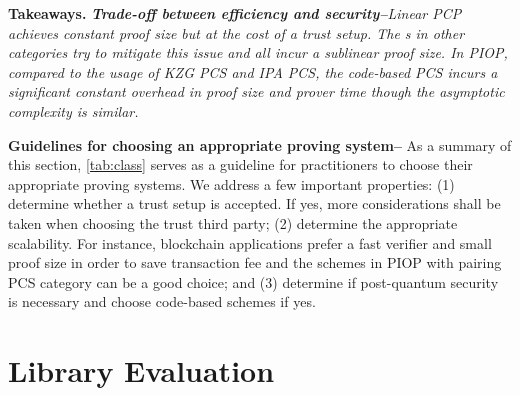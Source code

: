 \documentclass[letterpaper,twocolumn,10pt]{article}
\theoremstyle{definition}
\newcommand{\zk}{\text{zk-SNARK}\xspace}
\newcommand{\new}[1]{{#1}\xspace}
\newenvironment{takeaway}[1][]
  {
 \begin{tcolorbox}
 [%
    enhanced, 
    breakable,
    boxrule=0.5pt,
    arc=4pt,
    left=2pt,
    right=2pt,
    bottom=2pt,
    top=2pt,
    rounded corners
    ]{}
  \textbf{#1.}
  \small \itshape}
  {
\end{tcolorbox}
}
\begin{document}
\begin{takeaway}[Takeaways]
	\textbf{\new{Trade-off between efficiency and security--}}\new{Linear PCP achieves constant proof size but at the cost of a trust setup. The {\zk}s in other categories try to mitigate this issue and all incur a sublinear proof size. In PIOP, compared to the usage of KZG PCS and IPA PCS, the code-based PCS incurs a significant constant overhead in proof size and prover time though the asymptotic complexity is similar.}
	
	\par \textbf{\new{Guidelines for choosing an appropriate proving system--}}
	\new{As a summary of this section, \autoref{tab:class} serves as a guideline for practitioners to choose their appropriate proving systems. We address a few important properties: (1) determine whether a trust setup is accepted. If yes, more considerations shall be taken when choosing the trust third party; (2) determine the appropriate scalability. For instance, blockchain applications prefer a fast verifier and small proof size in order to save transaction fee and the schemes in PIOP with pairing PCS category can be a good choice; and (3) determine if post-quantum security is necessary and choose code-based schemes if yes.}
\end{takeaway}

\section{Library Evaluation}
\label{sec:implementation}
\end{document}

